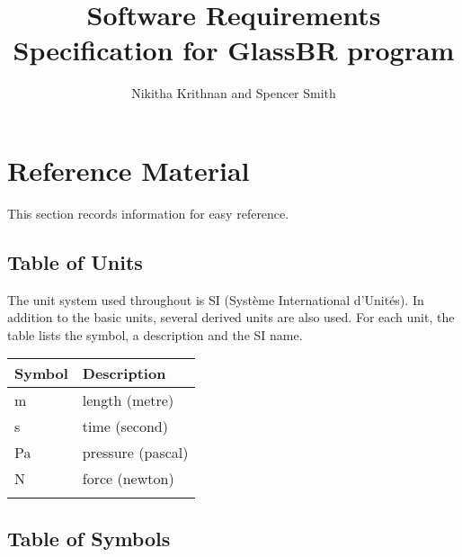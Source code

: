 \documentclass[12pt]{article}
\title{Software Requirements Specification for GlassBR program}
\author{Nikitha Krithnan and Spencer Smith}
\begin{document}
\maketitle
\tableofcontents
\newpage
\section{Reference Material}
\label{Sec:RM}
This section records information for easy reference.
\subsection{Table of Units}
\label{Sec:ToU}
The unit system used throughout is SI (Syst\`{e}me International d'Unit\'{e}s). In addition to the basic units, several derived units are also used. For each unit, the table lists the symbol, a description and the SI name.
\begin{longtable*}{l l}
\toprule
Symbol & Description
\\
\midrule
m & length (metre)
\\
s & time (second)
\\
Pa & pressure (pascal)
\\
N & force (newton)
\\
\bottomrule
\label{Table:ToU}
\end{longtable*}
\subsection{Table of Symbols}
\label{Sec:ToS}
\end{document}
